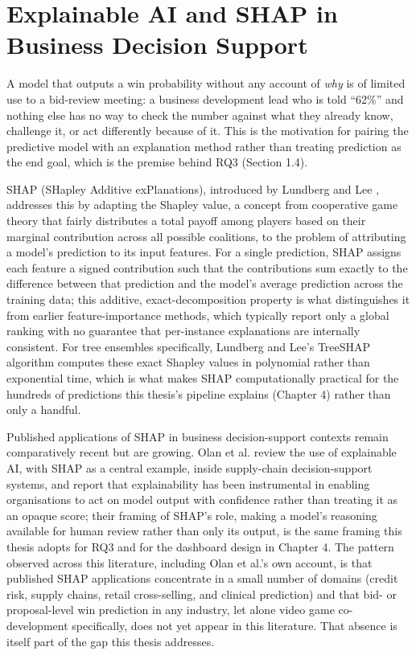 \documentclass[12pt,oneside]{report}
\begin{document}
\hypertarget{explainable-ai-and-shap-in-business-decision-support}{%
\section{Explainable AI and SHAP in Business Decision
Support}\label{explainable-ai-and-shap-in-business-decision-support}}

A model that outputs a win probability without any account of \emph{why}
is of limited use to a bid-review meeting: a business development lead
who is told ``62\%'' and nothing else has no way to check the number
against what they already know, challenge it, or act differently because
of it. This is the motivation for pairing the predictive model with an
explanation method rather than treating prediction as the end goal,
which is the premise behind RQ3 (Section 1.4).

SHAP (SHapley Additive exPlanations), introduced by Lundberg and Lee
\citep{lundberg2017unified}, addresses this by adapting the Shapley
value, a concept from cooperative game theory that fairly distributes a
total payoff among players based on their marginal contribution across
all possible coalitions, to the problem of attributing a model's
prediction to its input features. For a single prediction, SHAP assigns
each feature a signed contribution such that the contributions sum
exactly to the difference between that prediction and the model's
average prediction across the training data; this additive,
exact-decomposition property is what distinguishes it from earlier
feature-importance methods, which typically report only a global ranking
with no guarantee that per-instance explanations are internally
consistent. For tree ensembles specifically, Lundberg and Lee's TreeSHAP
algorithm computes these exact Shapley values in polynomial rather than
exponential time, which is what makes SHAP computationally practical for
the hundreds of predictions this thesis's pipeline explains (Chapter 4)
rather than only a handful.

Published applications of SHAP in business decision-support contexts
remain comparatively recent but are growing. Olan et al.
\citep{olan2024enabling} review the use of explainable AI, with SHAP as
a central example, inside supply-chain decision-support systems, and
report that explainability has been instrumental in enabling
organisations to act on model output with confidence rather than
treating it as an opaque score; their framing of SHAP's role, making a
model's reasoning available for human review rather than only its
output, is the same framing this thesis adopts for RQ3 and for the
dashboard design in Chapter 4. The pattern observed across this
literature, including Olan et al.'s own account, is that published SHAP
applications concentrate in a small number of domains (credit risk,
supply chains, retail cross-selling, and clinical prediction) and that
bid- or proposal-level win prediction in any industry, let alone video
game co-development specifically, does not yet appear in this
literature. That absence is itself part of the gap this thesis
addresses.
\end{document}
